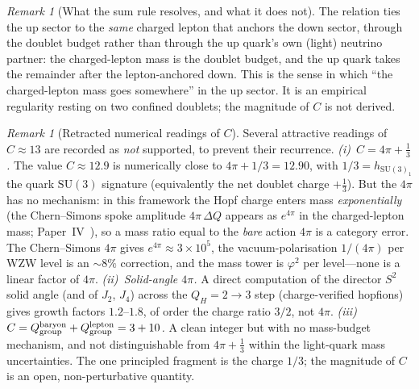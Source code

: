 \documentclass[11pt,a4paper]{article}
\theoremstyle{definition}\newtheorem{definition}[theorem]{Definition}
\theoremstyle{remark}
\newtheorem{remark}[theorem]{Remark}
\newcommand{\vp}{\varphi}
\newcommand{\SU}{\mathrm{SU}}
\newcommand{\QH}{Q_H}
\newcommand{\Qgr}{Q_{\mathrm{group}}}
\begin{document}
\begin{remark}[What the sum rule resolves, and what it does not]
\label{P20:rem:sumrule_scope}
The relation ties the up sector to the \emph{same} charged lepton that
anchors the down sector, through the doublet budget rather than through
the up quark's own (light) neutrino partner: the charged-lepton mass is
the doublet budget, and the up quark takes the remainder after the
lepton-anchored down. This is the sense in which ``the charged-lepton
mass goes somewhere'' in the up sector. It is an empirical regularity
resting on two confined doublets; the magnitude of $C$ is not derived.
\end{remark}

\begin{remark}[Retracted numerical readings of $C$]
\label{P20:rem:C_retractions}
Several attractive readings of $C\approx13$ are recorded as \emph{not}
supported, to prevent their recurrence.
\emph{(i)~$C=4\pi+\tfrac13$.} The value $C\approx12.9$ is numerically
close to $4\pi+1/3=12.90$, with $1/3=h_{\SU(3)_1}$ the quark
$\SU(3)$ signature (equivalently the net doublet charge $+\tfrac13$).
But the $4\pi$ has no mechanism: in this framework the Hopf charge
enters mass \emph{exponentially} (the Chern--Simons spoke amplitude
$4\pi\,\Delta Q$ appears as $e^{4\pi}$ in the charged-lepton mass;
Paper~IV~\cite{Paper4}), so a mass ratio equal to the \emph{bare}
action $4\pi$ is a category error. The Chern--Simons $4\pi$ gives
$e^{4\pi}\approx3\times10^5$, the vacuum-polarisation $1/(4\pi)$ per
WZW level is an $\sim8\%$ correction, and the mass tower is $\vp^2$ per
level---none is a linear factor of $4\pi$.
\emph{(ii)~Solid-angle $4\pi$.} A direct computation of the director
$S^2$ solid angle (and of $J_2$, $J_4$) across the $\QH=2\to3$ step
(charge-verified hopfions) gives growth factors $1.2$--$1.8$, of order
the charge ratio $3/2$, not $4\pi$.
\emph{(iii)~$C=\Qgr^{\rm baryon}+\Qgr^{\rm lepton}=3+10$.} A clean
integer but with no mass-budget mechanism, and not distinguishable from
$4\pi+\tfrac13$ within the light-quark mass uncertainties.
The one principled fragment is the charge $1/3$; the magnitude of $C$
is an open, non-perturbative quantity.
\end{remark}
\end{document}

